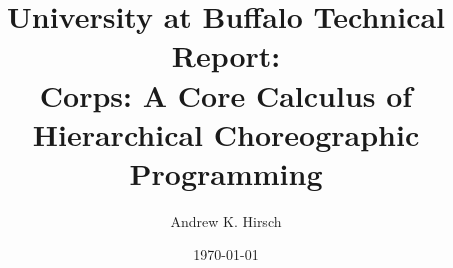\documentclass[acmsmall,nonacm]{acmart}
\title[Corps]{{\small University at Buffalo Technical Report:}\\ Corps: A Core Calculus of Hierarchical Choreographic Programming}
\date{\today}
\author{Andrew K. Hirsch}
\affiliation{
  \institution{University at Buffalo}
  \city{Buffalo}
  \country{USA}
}
\begin{document}
\begin{abstract}
  
\end{abstract}

\maketitle


  
\end{document}
